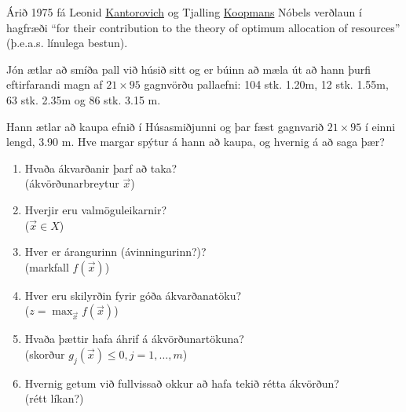 Árið 1975 fá Leonid \href{http://en.wikipedia.org/wiki/Kantorovich}{Kantorovich} og Tjalling \href{http://en.wikipedia.org/wiki/Tjalling_Koopmans}{Koopmans} Nóbels verðlaun í hagfræði ``for their contribution to the theory of 
optimum allocation of resources'' (þ.e.a.s. línulega bestun). 
 \newpage
\begin{samepage}
\begin{daemi} 
Jón ætlar að smíða pall við húsið sitt og er búinn að mæla út að hann þurfi eftirfarandi magn af $21\times95$ gagnvörðu pallaefni: 104 stk. 1.20m, 12 stk. 1.55m, 63 stk. 2.35m og 86 stk. 3.15 m. 
 
Hann ætlar að kaupa efnið í Húsasmiðjunni og þar fæst gagnvarið $21\times95$ í einni lengd, 3.90 m. Hve margar spýtur á hann að kaupa, og hvernig á að saga þær? 
\begin{samepage}
\begin{enumerate} 
\item Hvaða ákvarðanir þarf að taka? \\ (ákvörðunarbreytur $\vec{x}$) 
\item Hverjir eru valmöguleikarnir?  \\ ($\vec{x}\in X$) 
\item Hver er árangurinn (ávinningurinn?)? \\ (markfall $f(\vec{x})$) 
\item Hver eru skilyrðin fyrir góða ákvarðanatöku? \\ ($z=\max_\vec{x} f(\vec{x})$) 
\item Hvaða þættir hafa áhrif á ákvörðunartökuna? \\  (skorður $g_j(\vec{x})\le0, j=1,\ldots,m$) 
\item Hvernig getum við fullvissað okkur að hafa tekið rétta ákvörðun? \\ (rétt líkan?)  
\end{enumerate} 
\end{samepage}
\end{daemi}
\end{samepage}
